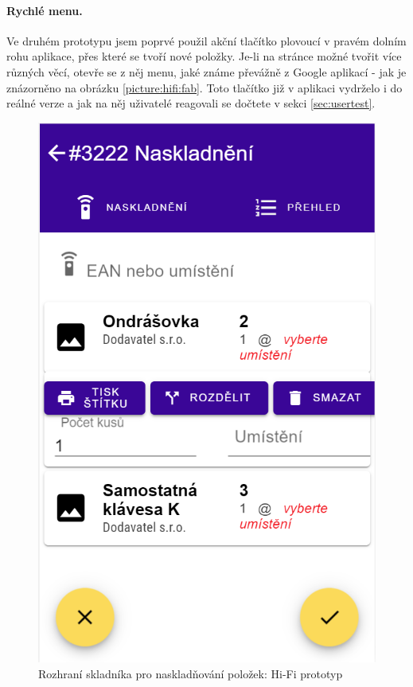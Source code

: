 \paragraph{Rychlé menu.} Ve druhém prototypu jsem poprvé použil akční tlačítko plovoucí v pravém dolním rohu aplikace, přes které se tvoří nové položky. Je-li na stránce možné tvořit více různých věcí, otevře se z něj menu, jaké známe převážně z Google aplikací - jak je znázorněno na obrázku \ref{picture:hifi:fab}. Toto tlačítko již v aplikaci vydrželo i do reálné verze a jak na něj uživatelé reagovali se dočtete v sekci \ref{sec:usertest}.

\begin{figure}[h]
\includegraphics[height=0.5\textheight]{../png/hifi/naskladneni.png}
\caption{Rozhraní skladníka pro naskladňování položek: Hi-Fi prototyp} \label{picture:hifi:naskladneni}
\end{figure}

